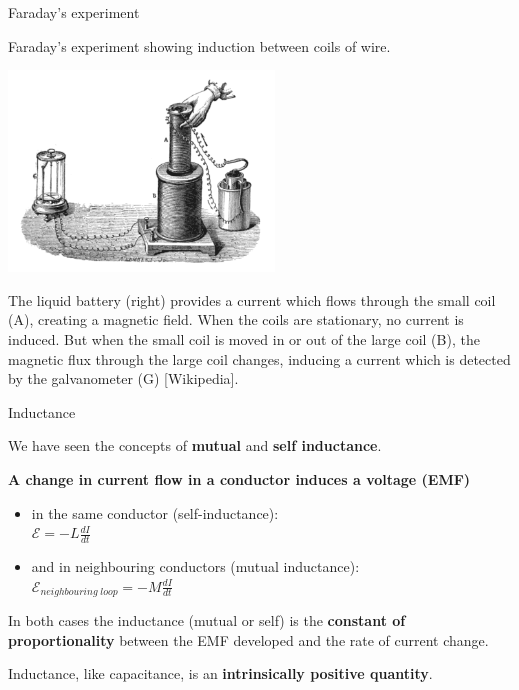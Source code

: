 \begin{frame}{Faraday's experiment}

Faraday's experiment showing induction between coils of wire.

\begin{center}
   \includegraphics[width=0.53\textwidth]{./images/schematics/faraday_induction_experiment.png}\\
\end{center}

{\scriptsize
    The liquid battery (right) provides a current which flows through the small coil (A),
    creating a magnetic field. When the coils are stationary, no current is induced.
    But when the small coil is moved in or out of the large coil (B),
    the magnetic flux through the large coil changes,
    inducing a current which is detected by the galvanometer (G)
    [Wikipedia].\\
}

\end{frame}




%
%
%

\begin{frame}{Inductance}

We have seen the concepts of {\bf mutual} and {\bf self inductance}.\\

\vspace{0.2cm}

{\bf A change in current flow in a conductor induces a voltage (EMF)}
\begin{itemize}
   \item in the same conductor (self-inductance): \\
             $\displaystyle \mathcal{E} = - L \frac{dI}{dt}$
   \item and in neighbouring conductors (mutual inductance):\\
            $\displaystyle \mathcal{E}_{neighbouring\;loop} = - M \frac{dI}{dt}$
\end{itemize}

\vspace{0.2cm}

In both cases the inductance (mutual or self) is the {\bf constant of proportionality}
between the EMF developed and the rate of current change.

\vspace{0.2cm}

Inductance, like capacitance, is an {\bf intrinsically positive quantity}.

\end{frame}

